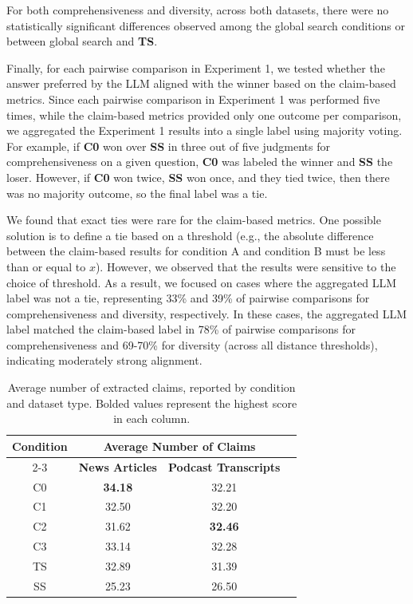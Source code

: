 \documentclass{article}
\begin{document}
For both comprehensiveness and diversity, across both datasets, there were no statistically significant differences observed among the global search conditions or between global search and \textbf{TS}.

Finally, for each pairwise comparison in Experiment 1, we tested whether the answer preferred by the LLM aligned with the winner based on the claim-based metrics. Since each pairwise comparison in Experiment 1 was performed five times, while the claim-based metrics provided only one outcome per comparison, we aggregated the Experiment 1 results into a single label using majority voting. For example, if \textbf{C0} won over \textbf{SS} in three out of five judgments for comprehensiveness on a given question, \textbf{C0} was labeled the winner and \textbf{SS} the loser.  However, if \textbf{C0} won twice, \textbf{SS} won once, and they tied twice, then there was no majority outcome, so the final label was a tie.

We found that exact ties were rare for the claim-based metrics. One possible solution is to define a tie based on a threshold (e.g., the absolute difference between the claim-based results for condition A and condition B must be less than or equal to $x$). However, we observed that the results were sensitive to the choice of threshold. As a result, we focused on cases where the aggregated LLM label was not a tie, representing 33\% and 39\% of pairwise comparisons for comprehensiveness and diversity, respectively. In these cases, the aggregated LLM label matched the claim-based label in 78\% of pairwise comparisons for comprehensiveness and 69-70\% for diversity (across all distance thresholds), indicating moderately strong alignment.



\begin{table}
\centering
\caption{Average number of extracted claims, reported by condition and dataset type. Bolded values represent the highest score in each column.}
\begin{tabular}{c ccc}
    \toprule
\multirow{2}{*}{\textbf{Condition}} 
        & \multicolumn{2}{c}{\textbf{Average Number of Claims}}   \\ 
    \cmidrule(lr){2-3}
        & \textbf{News Articles}  & \textbf{Podcast Transcripts}                  \\ 
    \midrule
C0    & \textbf{34.18}   & 32.21                     \\
C1    & 32.50   & 32.20                     \\
C2    & 31.62   & \textbf{32.46}                     \\
C3    & 33.14   & 32.28                     \\
TS       & 32.89   & 31.39                     \\
SS     & 25.23   & 26.50                     \\
    \bottomrule
\end{tabular}
\label{tab:claim_comp}
    \end{table}
\end{document}
